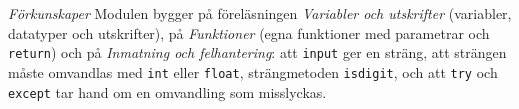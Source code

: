 \emph{Förkunskaper}
Modulen bygger på föreläsningen \emph{Variabler och utskrifter}
(variabler, datatyper och utskrifter), på \emph{Funktioner} (egna
funktioner med parametrar och \texttt{return}) och på
\emph{Inmatning och felhantering}: att
\texttt{input} ger en
sträng, att strängen måste omvandlas med \texttt{int} eller
\texttt{float}, strängmetoden \texttt{isdigit},
och att \texttt{try} och \texttt{except} tar
hand om en omvandling som misslyckas.

